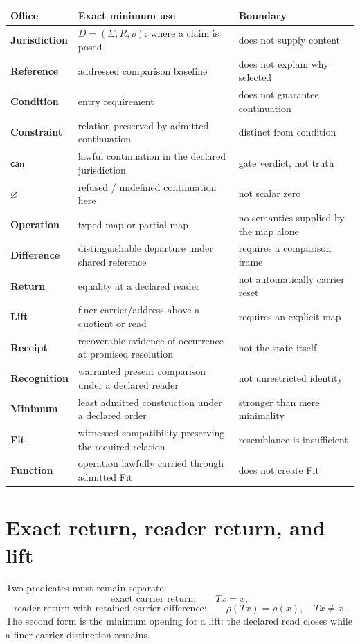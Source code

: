 \documentclass[11pt]{article}
\begin{document}
\small
\begin{tabularx}{\textwidth}{@{}>{\bfseries}p{0.88in}X X@{}}
\toprule
Office & Exact minimum use & Boundary\\
\midrule
Jurisdiction & \(D=(\Sigma,R,\rho)\): where a claim is posed & does not supply content\\
Reference & addressed comparison baseline & does not explain why selected\\
Condition & entry requirement & does not guarantee continuation\\
Constraint & relation preserved by admitted continuation & distinct from condition\\
\(\mathsf{can}\) & lawful continuation in the declared jurisdiction & gate verdict, not truth\\
\(\varnothing\) & refused / undefined continuation here & not scalar zero\\
Operation & typed map or partial map & no semantics supplied by the map alone\\
Difference & distinguishable departure under shared reference & requires a comparison frame\\
Return & equality at a declared reader & not automatically carrier reset\\
Lift & finer carrier/address above a quotient or read & requires an explicit map\\
Receipt & recoverable evidence of occurrence at promised resolution & not the state itself\\
Recognition & warranted present comparison under a declared reader & not unrestricted identity\\
Minimum & least admitted construction under a declared order & stronger than mere minimality\\
Fit & witnessed compatibility preserving the required relation & resemblance is insufficient\\
Function & operation lawfully carried through admitted Fit & does not create Fit\\
\bottomrule
\end{tabularx}
\normalsize

\section{Exact return, reader return, and lift}
Two predicates must remain separate:
\[
\text{exact carrier return:}\qquad Tx=x,
\]
\[
\text{reader return with retained carrier difference:}\qquad
\rho(Tx)=\rho(x),\quad Tx\neq x.
\]
The second form is the minimum opening for a lift: the declared read closes while a finer carrier distinction remains.
\end{document}
